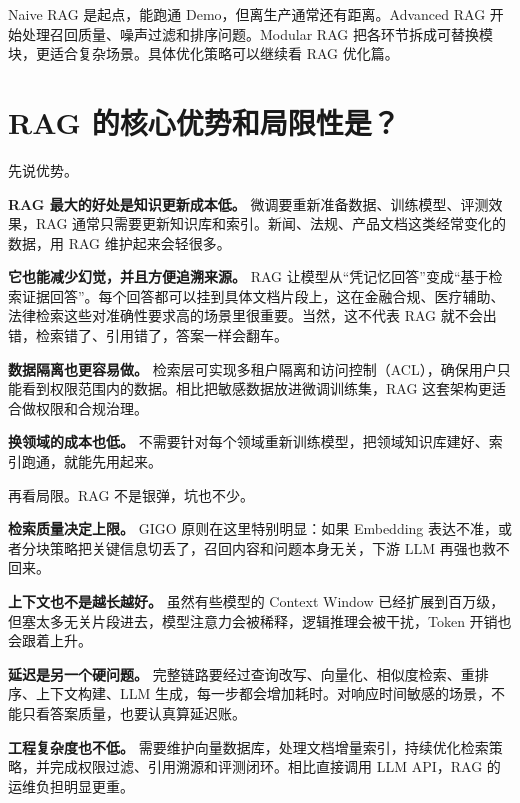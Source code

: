 \documentclass[9pt,a4paper,twocolumn]{ctexart}
\begin{document}
Naive RAG 是起点，能跑通 Demo，但离生产通常还有距离。Advanced RAG 开始处理召回质量、噪声过滤和排序问题。Modular RAG 把各环节拆成可替换模块，更适合复杂场景。具体优化策略可以继续看 RAG 优化篇。



\section*{RAG 的核心优势和局限性是？}


先说优势。



\textbf{RAG 最大的好处是知识更新成本低。} 微调要重新准备数据、训练模型、评测效果，RAG 通常只需要更新知识库和索引。新闻、法规、产品文档这类经常变化的数据，用 RAG 维护起来会轻很多。



\textbf{它也能减少幻觉，并且方便追溯来源。} RAG 让模型从“凭记忆回答”变成“基于检索证据回答”。每个回答都可以挂到具体文档片段上，这在金融合规、医疗辅助、法律检索这些对准确性要求高的场景里很重要。当然，这不代表 RAG 就不会出错，检索错了、引用错了，答案一样会翻车。



\textbf{数据隔离也更容易做。} 检索层可实现多租户隔离和访问控制（ACL），确保用户只能看到权限范围内的数据。相比把敏感数据放进微调训练集，RAG 这套架构更适合做权限和合规治理。



\textbf{换领域的成本也低。} 不需要针对每个领域重新训练模型，把领域知识库建好、索引跑通，就能先用起来。



再看局限。RAG 不是银弹，坑也不少。



\textbf{检索质量决定上限。} GIGO 原则在这里特别明显：如果 Embedding 表达不准，或者分块策略把关键信息切丢了，召回内容和问题本身无关，下游 LLM 再强也救不回来。



\textbf{上下文也不是越长越好。} 虽然有些模型的 Context Window 已经扩展到百万级，但塞太多无关片段进去，模型注意力会被稀释，逻辑推理会被干扰，Token 开销也会跟着上升。



\textbf{延迟是另一个硬问题。} 完整链路要经过查询改写、向量化、相似度检索、重排序、上下文构建、LLM 生成，每一步都会增加耗时。对响应时间敏感的场景，不能只看答案质量，也要认真算延迟账。



\textbf{工程复杂度也不低。} 需要维护向量数据库，处理文档增量索引，持续优化检索策略，并完成权限过滤、引用溯源和评测闭环。相比直接调用 LLM API，RAG 的运维负担明显更重。
\end{document}
